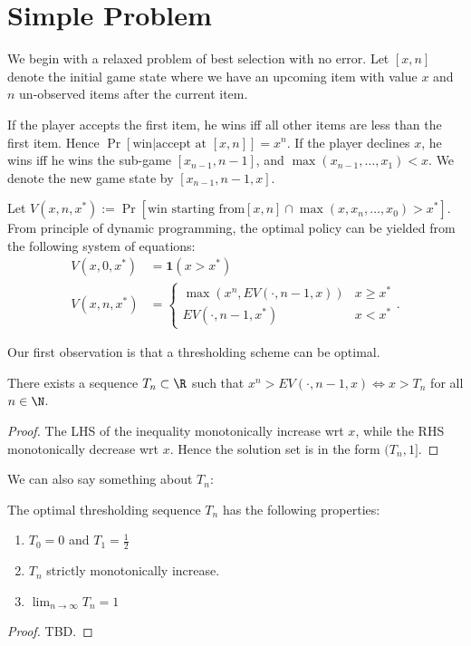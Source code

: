
\section{Simple Problem}
We begin with a relaxed problem of best selection with no error. Let $[x,n]$ denote the initial game state where we have an upcoming item with value $x$ and $n$ un-observed items after the current item.

If the player accepts the first item, he wins iff all other items are less than the first item. Hence $\operatorname{Pr}\left[{\text{win} | \text{accept at } [x,n]}\right] = x^{n}$.  
If the player declines $x$, he wins iff he wins the sub-game $[x_{n-1}, n-1]$, and $\max(x_{n-1}, \ldots, x_1) < x$. We denote the new game state by $[x_{n-1}, n-1, x]$.

Let $V(x,n,x^*) := \operatorname{Pr}\left[{\text{win starting from} [x,n] \cap \max\left( x, x_n, \ldots, x_0 \right) > x^*}\right] $. From principle of dynamic programming, the optimal policy can be yielded from the following system of equations:
\begin{align*}
	V(x, 0, x^*) &= \textbf{1}(x>x^*)\\
	V(x, n, x^*) &= \begin{cases}
		\max\left( x^n,   EV(\cdot,n-1, x)\right) &x\ge x^*\\
		EV(\cdot, n-1, x^*) &x<x^*
	\end{cases}
.\end{align*}

Our first observation is that a thresholding scheme can be optimal.

\begin{theorem}
	There exists a sequence $T_n \subset \R$ such that $ x^n>  EV(\cdot,n-1, x)\iff x > T_n$ for all $n \in  \N$. 
\end{theorem}
\begin{proof}
	The LHS of the inequality monotonically increase wrt $x$, while the RHS monotonically decrease wrt $x$. Hence the solution set is in the form $(T_n, 1]$.
\end{proof}

We can also say something about $T_n $:

\begin{theorem}
	The optimal thresholding sequence $T_n$ has the following properties:
	\begin{enumerate}
		\item $T_0 = 0 $ and $T_1 = \frac{1}{2}$
		 \item $T_n$ strictly monotonically increase.
		\item  $\lim_{n \to \infty} T_n = 1$
	\end{enumerate}
\end{theorem}
\begin{proof}
	TBD.
\end{proof}

